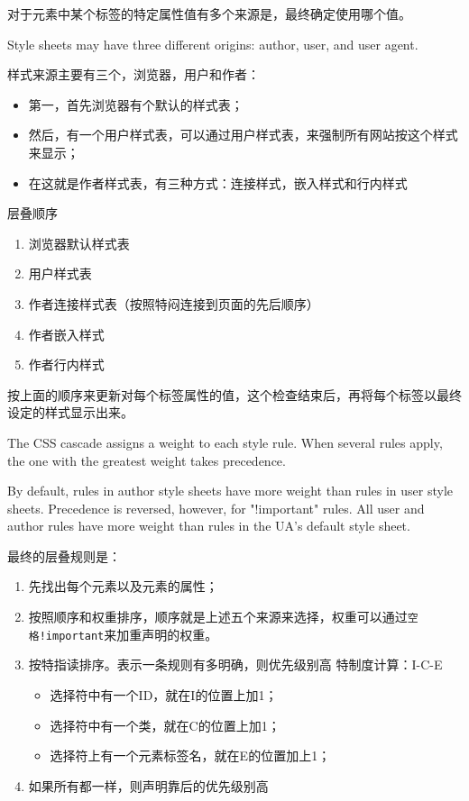 对于元素中某个标签的特定属性值有多个来源是，最终确定使用哪个值。

Style sheets may have three different origins: author, user, and user agent.

样式来源主要有三个，浏览器，用户和作者：
\begin{itemize}
\item 第一，首先浏览器有个默认的样式表；
\item 然后，有一个用户样式表，可以通过用户样式表，来强制所有网站按这个样式来显示；
\item 在这就是作者样式表，有三种方式：连接样式，嵌入样式和行内样式
\end{itemize}

层叠顺序
\begin{enumerate}
\item 浏览器默认样式表
\item 用户样式表
\item 作者连接样式表（按照特闷连接到页面的先后顺序）
\item 作者嵌入样式
\item 作者行内样式
\end{enumerate}

按上面的顺序来更新对每个标签属性的值，这个检查结束后，再将每个标签以最终设定的样式显示出来。

The CSS cascade assigns a weight to each style rule. When several rules apply, the one with the greatest weight takes precedence. 

By default, rules in author style sheets have more weight than rules in user style sheets. Precedence is reversed, however, for "!important" rules. All user and author rules have more weight than rules in the UA's default style sheet. 


最终的层叠规则是：
\begin{enumerate}
\item 先找出每个元素以及元素的属性；
\item 按照顺序和权重排序，顺序就是上述五个来源来选择，权重可以通过\lstinline$空格!important$来加重声明的权重。
\item 按特指读排序。表示一条规则有多明确，则优先级别高
特制度计算：I-C-E
\begin{itemize}
\item 选择符中有一个ID，就在I的位置上加1；
\item 选择符中有一个类，就在C的位置上加1；
\item 选择符上有一个元素标签名，就在E的位置加上1；
\end{itemize}
\item 如果所有都一样，则声明靠后的优先级别高
\end{enumerate}




